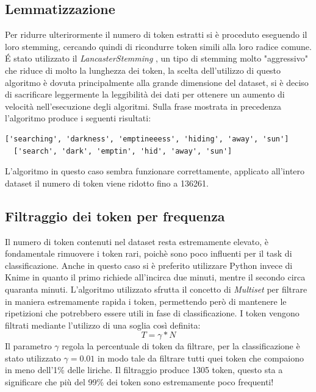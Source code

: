\documentclass[technote]{IEEEtran}
\begin{document}
\subsection{Lemmatizzazione}
Per ridurre ulterirormente il numero di token estratti si è proceduto eseguendo il loro stemming, cercando quindi di ricondurre token simili alla loro radice comune. \'E stato utilizzato il \textit{LancasterStemming} \cite{10.1145/101306.101310}, un tipo di stemming molto "aggressivo" che riduce di molto la lunghezza dei token, la scelta dell'utilizzo di questo algoritmo è dovuta principalmente alla grande dimensione del dataset, si è deciso di sacrificare leggermente la leggibilità dei dati per ottenere un aumento di velocità nell'esecuzione degli algoritmi. Sulla frase mostrata in precedenza l'algoritmo produce i seguenti risultati:
\begin{lstlisting}[basicstyle=\tiny]
  ['searching', 'darkness', 'emptineeess', 'hiding', 'away', 'sun']
  ['search', 'dark', 'emptin', 'hid', 'away', 'sun']
\end{lstlisting}
L'algoritmo in questo caso sembra funzionare correttamente, applicato all'intero dataset il numero di token viene ridotto fino a 136261.
\subsection{Filtraggio dei token per frequenza}
Il numero di token contenuti nel dataset resta estremamente elevato, è fondamentale rimuovere i token rari, poichè sono poco influenti per il task di classificazione.
Anche in questo caso si è preferito utilizzare Python invece di Knime in quanto il primo richiede all'incirca due minuti, mentre il secondo circa quaranta minuti. L'algoritmo utilizzato sfrutta il concetto di \textit{Multiset} per filtrare in maniera estremamente rapida i token, permettendo però di mantenere le ripetizioni che potrebbero essere utili in fase di classificazione.
I token vengono filtrati mediante l'utilizzo di una soglia così definita:
\begin{equation}
T = \gamma * N 
\end{equation}
Il parametro $ \gamma $ regola la percentuale di token da filtrare, per la classificazione è stato utilizzato $ \gamma = 0.01 $ in modo tale da filtrare tutti quei token che compaiono in meno dell'1\% delle liriche.
Il filtraggio produce 1305 token, questo sta a significare che più del 99\% dei token sono estremamente poco frequenti!
\end{document}
